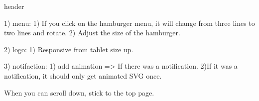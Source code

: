 header {
    1) menu: {
        1) If you click on the hamburger menu, it will change from three lines to two lines and rotate.
        2) Adjust the size of the hamburger.
    }

    2) logo: {
        1) Responsive from tablet size up.
    }

    3) notifaction: {
        1) add animation => If there was a notification.
        2)If it was a notification, it should only get animated SVG once.
    }

    When you can scroll down, stick to the top page.
}